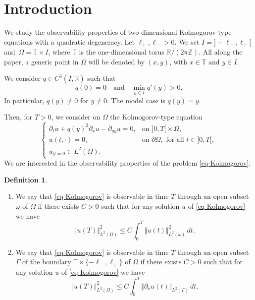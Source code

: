 \documentclass[11pt]{article}
\newcommand{\skpt}{\smallskip}
\numberwithin{equation}{section}
\theoremstyle{plain}
\theoremstyle{definition}
\newtheorem{definition}[theorem]{Definition}
\newcommand{\nr}[1]{\Vert #1\Vert}
\newcommand{\1}{\mathds 1}
\newcommand{\R}{\mathbb{R}}
\newcommand{\Z}{\mathbb{Z}}
\newcommand{\T}{\mathbb{T}}
\let\G\Gamma
\let\o\omega
\let\O\Omega
\begin{document}
\section{Introduction}

We study the observability properties of two-dimensional Kolmogorov-type equations with a quadratic degeneracy. Let $\ell_+, \ell_- >0$. We set $I ={} ]-\ell_-,\ell_+[$ and~$\O = \T \times I$, where $\T$ is the one-dimensional torus $\R / (2 \pi \Z)$. All along the paper, a generic point in $\O$ will be denoted by $(x,y)$, with $x \in \T$ and $y \in I$.

We consider $q \in C^3 (\bar I,\R)$ such that
\[
q(0) = 0 \quad \text{and} \quad \min_{y \in I} q'(y) > 0.
\]
In particular, $q(y) \neq 0$ for $y \neq 0$. The model case is $q(y) = y$.

Then, for $T > 0$, we consider on $\O$ the Kolmogorov-type equation
\begin{equation} \label{eq-Kolmogorov}
\begin{cases}
\partial_t u + q(y)^2 \partial_x u - \partial_{yy} u = 0, & \text{on } ]0,T[{}\times \O,\\
u(t,\cdot) = 0, & \text{on } \partial\O, \text{ for all } t \in{}]0,T[,\\
u_{|t=0} \in L^2 (\O).
\end{cases}
\end{equation}
We are interested in the observability properties of the problem \eqref{eq-Kolmogorov}:

\skpt
\begin{definition}
\begin{enumerate}
\item We say that \eqref{eq-Kolmogorov} is observable in time $T$ through an open subset $\omega$ of $\O$ if there exists $C > 0$ such that for any solution $u$ of \eqref{eq-Kolmogorov} we have
\begin{equation} \label{eq-obs-vol}
\nr{u(T)}_{L^2(\O)}^2 \leq C \int_0^T \nr{u(t)}_{L^2(\o)}^2 \, dt.
\end{equation}
\item We say that \eqref{eq-Kolmogorov} is observable in time $T$ through an open subset $\Gamma$ of the boundary $\T \times \{-\ell_-,\ell_+\}$ of $\O$ if there exists $C > 0$ such that for any solution $u$ of \eqref{eq-Kolmogorov} we have
\begin{equation} \label{eq-obs-Gamma}
\nr{u(T)}_{L^2(\O)}^2 \leq C \int_0^T \nr{\partial_\nu u(t)}_{L^2(\G)} \, dt.
\end{equation}
\end{enumerate}
\end{definition}
\end{document}
